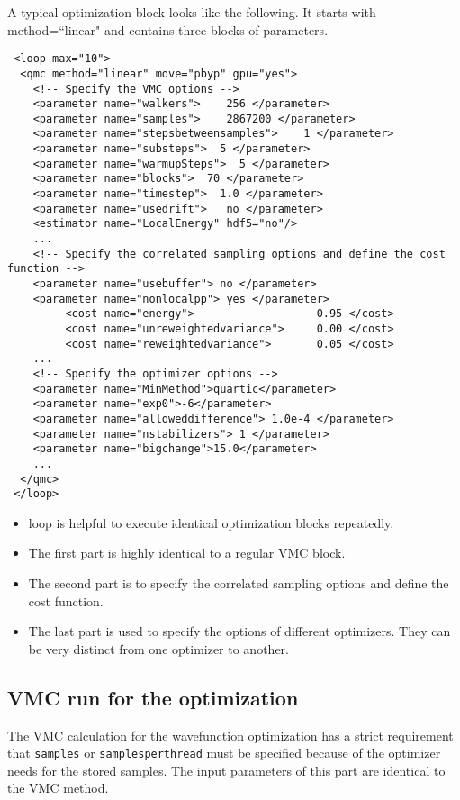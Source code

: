 A typical optimization block looks like the following. It starts with method=``linear" and contains three blocks of parameters.
\begin{lstlisting}
 <loop max="10">
  <qmc method="linear" move="pbyp" gpu="yes">
    <!-- Specify the VMC options -->
    <parameter name="walkers">    256 </parameter>
    <parameter name="samples">    2867200 </parameter>
    <parameter name="stepsbetweensamples">    1 </parameter>
    <parameter name="substeps">  5 </parameter>
    <parameter name="warmupSteps">  5 </parameter>
    <parameter name="blocks">  70 </parameter>
    <parameter name="timestep">  1.0 </parameter>
    <parameter name="usedrift">   no </parameter>
    <estimator name="LocalEnergy" hdf5="no"/>
    ...
    <!-- Specify the correlated sampling options and define the cost function -->
    <parameter name="usebuffer"> no </parameter>
    <parameter name="nonlocalpp"> yes </parameter>
         <cost name="energy">                   0.95 </cost>
         <cost name="unreweightedvariance">     0.00 </cost>
         <cost name="reweightedvariance">       0.05 </cost>
    ...
    <!-- Specify the optimizer options -->
    <parameter name="MinMethod">quartic</parameter>
    <parameter name="exp0">-6</parameter>
    <parameter name="alloweddifference"> 1.0e-4 </parameter>
    <parameter name="nstabilizers"> 1 </parameter>
    <parameter name="bigchange">15.0</parameter>
    ...
  </qmc>
 </loop>
\end{lstlisting}
\begin{itemize}
\item loop is helpful to execute identical optimization blocks repeatedly.
\item The first part is highly identical to a regular VMC block.
\item The second part is to specify the correlated sampling options and define the cost function.
\item The last part is used to specify the options of different optimizers. They can be very distinct from one optimizer to another.
\end{itemize}

\subsection{VMC run for the optimization}
The VMC calculation for the wavefunction optimization has a strict requirement 
that \texttt{samples} or \texttt{samplesperthread} must be specified because of the optimizer needs for the stored samples.
The input parameters of this part are identical to the VMC method.

